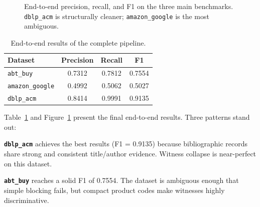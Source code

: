 \documentclass[10pt,twocolumn]{article}
\begin{document}
\begin{figure}[t]
\centering
{}
\caption{End-to-end precision, recall, and F1 on the three main benchmarks.
  \texttt{dblp\_acm} is structurally cleaner; \texttt{amazon\_google} is the
  most ambiguous.}
\label{fig:finalgraph}
\end{figure}

\begin{table}[t]
\centering
\caption{End-to-end results of the complete pipeline.}
\label{tab:finalresults}
\begin{tabular}{lccc}
\toprule
Dataset & Precision & Recall & F1 \\
\midrule
\texttt{abt\_buy}       & 0.7312 & 0.7812 & 0.7554 \\
\texttt{amazon\_google} & 0.4992 & 0.5062 & 0.5027 \\
\texttt{dblp\_acm}      & 0.8414 & 0.9991 & 0.9135 \\
\bottomrule
\end{tabular}
\end{table}

Table~\ref{tab:finalresults} and Figure~\ref{fig:finalgraph} present the
final end-to-end results. Three patterns stand out:

\textbf{\texttt{dblp\_acm}} achieves the best results (F1 = 0.9135) because
bibliographic records share strong and consistent title/author evidence.
Witness collapse is near-perfect on this dataset.

\textbf{\texttt{abt\_buy}} reaches a solid F1 of 0.7554. The dataset is
ambiguous enough that simple blocking fails, but compact product codes make
witnesses highly discriminative.
\end{document}
